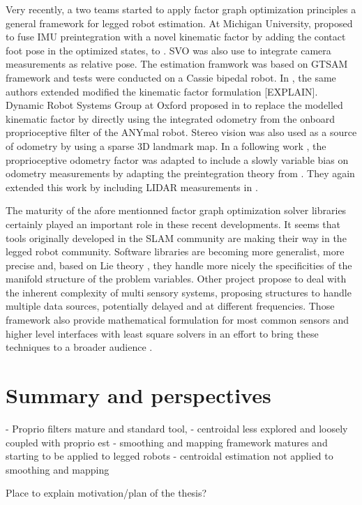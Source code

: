 Very recently, a two teams started to apply factor graph optimization principles a general framework for legged robot estimation. At Michigan University, \cite{hartley2018legged} 
proposed to fuse IMU preintegration with a novel kinematic factor by adding the contact foot pose in the optimized states, to \cite{bloesch2013state,rotella2014state}. 
SVO \cite{forster2014svo} was also use to integrate camera measurements as relative pose. The estimation framwork was based on GTSAM framework \cite{dellaert2012factor}
and tests were conducted on a Cassie bipedal robot. In \cite{hartley2018hybrid}, the same authors extended 
modified the kinematic factor formulation [EXPLAIN]. Dynamic Robot Systems Group at Oxford proposed in \cite{wisth2019robust} to replace the modelled 
kinematic factor by directly using the integrated odometry from the onboard proprioceptive filter of the ANYmal robot. Stereo vision was also used as a source of
odometry by using a sparse 3D landmark map. In a following work \cite{wisth2020preintegrated}, the proprioceptive odometry factor was adapted
to include a slowly variable bias on odometry measurements by adapting the preintegration theory from \cite{forster2017-TRO}. They again extended this work
by including LIDAR measurements in \cite{wisth2021vilens}.

The maturity of the afore mentionned factor graph optimization solver libraries certainly played an important role in these recent developments. It seems
that tools originally developed in the SLAM community are making their way in the legged robot community. Software libraries are becoming more
generalist, more precise and, based on Lie theory \cite{sola2018micro}, they handle more nicely the specificities of the manifold structure of the problem variables.
Other project propose to deal with the inherent complexity of multi sensory systems, proposing structures to handle multiple data sources, potentially delayed and at
different frequencies. Those framework also provide mathematical formulation for most common sensors and higher level interfaces with least square solvers 
in an effort to bring these techniques to a broader audience \cite{sola2021wolf, blanco2019modular, colosi2020plug}.



\section{Summary and perspectives}
- Proprio filters mature and standard tool, 
- centroidal less explored and loosely coupled with proprio est
- smoothing and mapping framework matures and starting to be applied to legged robots
- centroidal estimation not applied to smoothing and mapping

Place to explain motivation/plan of the thesis?
